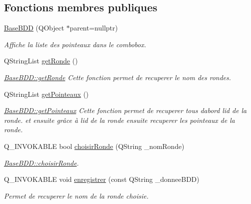 \subsection*{Fonctions membres publiques}
\begin{DoxyCompactItemize}
\item 
\hyperlink{class_base_b_d_d_ae9e4c871c20e159acbd08a97a7a6aa45}{Base\+B\+DD} (Q\+Object $\ast$parent=nullptr)
\begin{DoxyCompactList}\small\item\em Affiche la liste des pointeaux dans le combobox. \end{DoxyCompactList}\item 
Q\+String\+List \hyperlink{class_base_b_d_d_ad72a05677ec0613187ede9eb08f921b9}{get\+Ronde} ()
\begin{DoxyCompactList}\small\item\em \hyperlink{class_base_b_d_d_ad72a05677ec0613187ede9eb08f921b9}{Base\+B\+D\+D\+::get\+Ronde} Cette fonction permet de recuperer le nom des rondes. \end{DoxyCompactList}\item 
Q\+String\+List \hyperlink{class_base_b_d_d_ab5db945df6714aca26fe5b0eaa629c66}{get\+Pointeaux} ()
\begin{DoxyCompactList}\small\item\em \hyperlink{class_base_b_d_d_ab5db945df6714aca26fe5b0eaa629c66}{Base\+B\+D\+D\+::get\+Pointeaux} Cette fonction permet de recuperer tous d\textquotesingle{}abord l\textquotesingle{}id de la ronde. et ensuite grâce à l\textquotesingle{}id de la ronde ensuite recuperer les pointeaux de la ronde. \end{DoxyCompactList}\item 
Q\+\_\+\+I\+N\+V\+O\+K\+A\+B\+LE bool \hyperlink{class_base_b_d_d_aaf97d5447c9e64403c95458630434b7a}{choisir\+Ronde} (Q\+String \+\_\+nom\+Ronde)
\begin{DoxyCompactList}\small\item\em \hyperlink{class_base_b_d_d_aaf97d5447c9e64403c95458630434b7a}{Base\+B\+D\+D\+::choisir\+Ronde}. \end{DoxyCompactList}\item 
Q\+\_\+\+I\+N\+V\+O\+K\+A\+B\+LE void \hyperlink{class_base_b_d_d_a90699f331825ff764a578233a45a2d17}{enregistrer} (const Q\+String \+\_\+donnee\+B\+DD)
\begin{DoxyCompactList}\small\item\em Permet de recuperer le nom de la ronde choisie. \end{DoxyCompactList}\item 

\end{DoxyCompactItemize}
